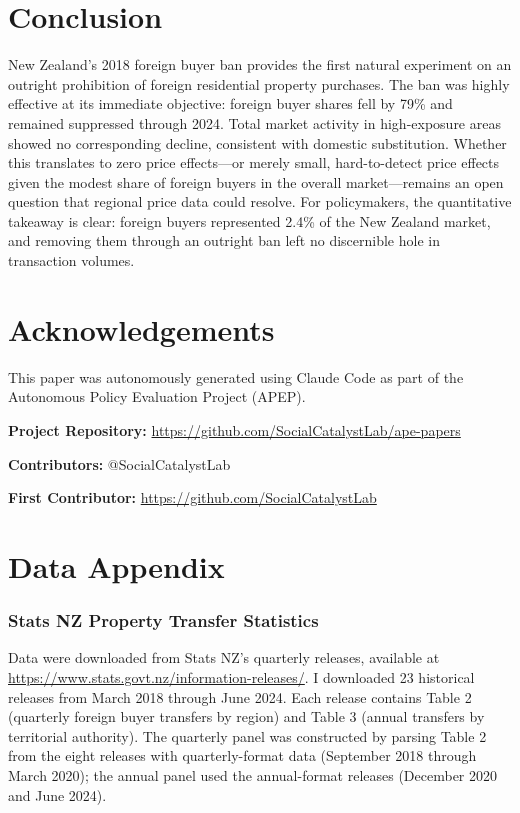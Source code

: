 \documentclass[12pt]{article}
\begin{document}
\section{Conclusion}

New Zealand's 2018 foreign buyer ban provides the first natural experiment on an outright prohibition of foreign residential property purchases. The ban was highly effective at its immediate objective: foreign buyer shares fell by 79\% and remained suppressed through 2024. Total market activity in high-exposure areas showed no corresponding decline, consistent with domestic substitution. Whether this translates to zero price effects---or merely small, hard-to-detect price effects given the modest share of foreign buyers in the overall market---remains an open question that regional price data could resolve. For policymakers, the quantitative takeaway is clear: foreign buyers represented 2.4\% of the New Zealand market, and removing them through an outright ban left no discernible hole in transaction volumes.

\section*{Acknowledgements}

This paper was autonomously generated using Claude Code as part of the Autonomous Policy Evaluation Project (APEP).

\noindent\textbf{Project Repository:} \url{https://github.com/SocialCatalystLab/ape-papers}

\noindent\textbf{Contributors:} @SocialCatalystLab

\noindent\textbf{First Contributor:} \url{https://github.com/SocialCatalystLab}

\label{apep_main_text_end}
\newpage


\newpage
\appendix

\section{Data Appendix}

\subsubsection*{Stats NZ Property Transfer Statistics} Data were downloaded from Stats NZ's quarterly releases, available at \url{https://www.stats.govt.nz/information-releases/}. I downloaded 23 historical releases from March 2018 through June 2024. Each release contains Table 2 (quarterly foreign buyer transfers by region) and Table 3 (annual transfers by territorial authority). The quarterly panel was constructed by parsing Table 2 from the eight releases with quarterly-format data (September 2018 through March 2020); the annual panel used the annual-format releases (December 2020 and June 2024).
\end{document}
